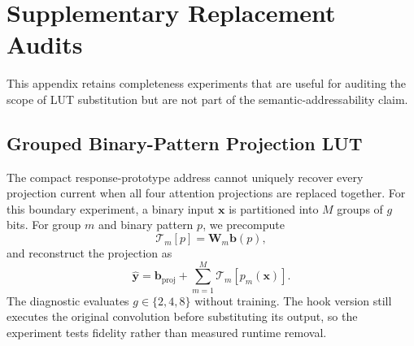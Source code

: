 \section{Supplementary Replacement Audits}
\label{sec:supp_replacement}

This appendix retains completeness experiments that are useful for auditing the
scope of LUT substitution but are not part of the semantic-addressability
claim.

\subsection{Grouped Binary-Pattern Projection LUT}

The compact response-prototype address cannot uniquely recover every projection
current when all four attention projections are replaced together. For this
boundary experiment, a binary input $\mathbf x$ is partitioned into $M$ groups
of $g$ bits. For group $m$ and binary pattern $p$, we precompute
\begin{equation}
  \mathcal T_m[p]=\mathbf W_m\mathbf b(p),
\end{equation}
and reconstruct the projection as
\begin{equation}
  \hat{\mathbf y}=\mathbf b_{\mathrm{proj}}+
  \sum_{m=1}^{M}\mathcal T_m[p_m(\mathbf x)].
\end{equation}
The diagnostic evaluates $g\in\{2,4,8\}$ without training. The hook version
still executes the original convolution before substituting its output, so the
experiment tests fidelity rather than measured runtime removal.

\begin{table}[h]
\centering
\footnotesize
{}
\caption{All-attention projection-current fidelity on CIFAR-100. Small
positive deltas are no-loss fluctuations.}
\label{tab:supp_grouped_projection}
\end{table}


